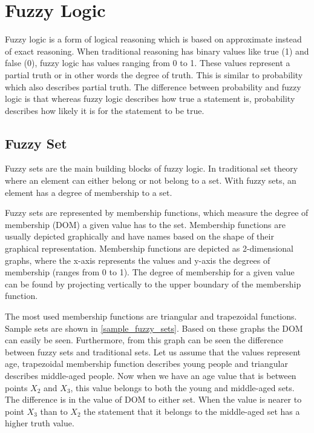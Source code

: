 \section{Fuzzy Logic}

Fuzzy logic is a form of logical reasoning which is based on approximate instead of exact reasoning. When traditional reasoning has binary values like true (1) and false (0), fuzzy logic has values ranging from 0 to 1. These values represent a partial truth or in other words the degree of truth. This is similar to probability which also describes partial truth. The difference between probability and fuzzy logic is that whereas fuzzy logic describes how true a statement is, probability describes how likely it is for the statement to be true. 

\subsection{Fuzzy Set}
Fuzzy sets \cite{fuzzy_control_introduction} are the main building blocks of fuzzy logic. In traditional set theory where an element can either belong or not belong to a set. With fuzzy sets, an element has a degree of membership to a set. 

Fuzzy sets are represented by membership functions, which measure the degree of membership (DOM) a given value has to the set. Membership functions are usually depicted graphically and have names based on the shape of their graphical representation. Membership functions are depicted as 2-dimensional graphs, where the x-axis represents the values and y-axis the degrees of membership (ranges from 0 to 1). The degree of membership for a given value can be found by projecting vertically to the upper boundary of the membership function. 

The most used membership functions are triangular and trapezoidal functions. Sample sets are shown in \autoref{sample_fuzzy_sets}. Based on these graphs the DOM can easily be seen. Furthermore, from this graph can be seen the difference between fuzzy sets and traditional sets. Let us assume that the values represent age, trapezoidal membership function describes young people and triangular describes middle-aged people. Now when we have an age value that is between points $X_2$ and $X_3$, this value belongs to both the young and middle-aged sets. The difference is in the value of DOM to either set. When the value is nearer to point $X_3$ than to $X_2$ the statement that it belongs to the middle-aged set has a higher truth value.  

